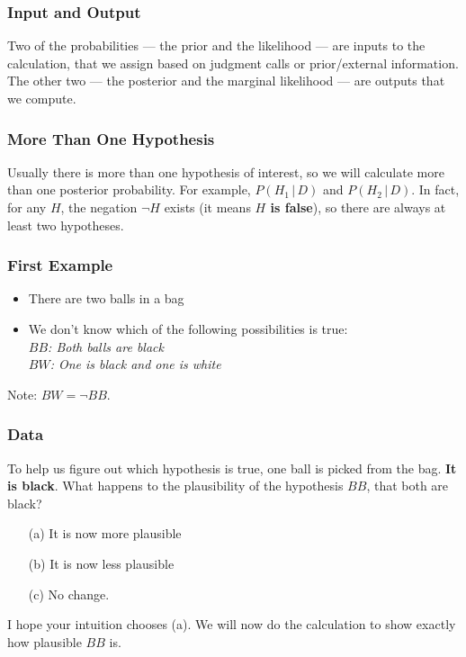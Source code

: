 \documentclass{beamer}
\newcommand{\given}{\,|\,}
\begin{document}
\begin{frame}
\frametitle{Input and Output}
Two of the probabilities --- the prior and the likelihood --- are inputs to
the calculation, that we assign based on judgment calls or prior/external
information.\\

The other two --- the posterior and the marginal likelihood --- are outputs
that we compute.
\end{frame}


\begin{frame}
\frametitle{More Than One Hypothesis}
Usually there is more than one hypothesis of interest, so we will calculate
more than one posterior probability. For example, $P(H_1 \given D)$ and
$P(H_2 \given D)$. In fact, for any $H$, the negation $\neg H$ exists
(it means {\bf $H$ is false}), so there are always at least two hypotheses.


\end{frame}


\begin{frame}
\frametitle{First Example}
\begin{itemize}
\item There are two balls in a bag \pause
\item We don't know which of the following possibilities is true:\\\pause
{\em $BB$: Both balls are black}\\
{\em $BW$: One is black and one is white}
\end{itemize}\pause

Note: $BW = \neg BB$.
\end{frame}


\begin{frame}
\frametitle{Data}
To help us figure out which hypothesis is true, one ball is picked
from the bag. {\bf It is black}. What happens to the plausibility of
the hypothesis $BB$, that both are black?\pause

\begin{itemize}
\item[(a)] It is now more plausible
\item[(b)] It is now less plausible
\item[(c)] No change.
\end{itemize}\pause

I hope your intuition chooses (a). We will now do the calculation to
show exactly how plausible $BB$ is.


\end{frame}
\end{document}
